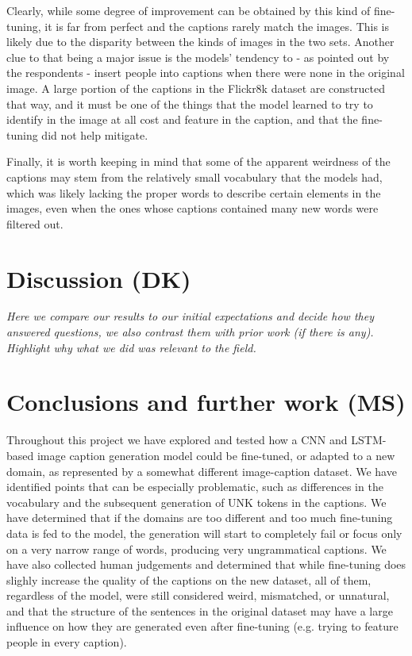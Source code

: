 \documentclass[11pt]{article}
\begin{document}
Clearly, while some degree of improvement can be obtained by this kind of fine-tuning, it is far from perfect and the captions rarely match the images. This is likely due to the disparity between the kinds of images in the two sets. Another clue to that being a major issue is the models' tendency to - as pointed out by the respondents - insert people into captions when there were none in the original image. A large portion of the captions in the Flickr8k dataset are constructed that way, and it must be one of the things that the model learned to try to identify in the image at all cost and feature in the caption, and that the fine-tuning did not help mitigate.

Finally, it is worth keeping in mind that some of the apparent weirdness of the captions may stem from the relatively small vocabulary that the models had, which was likely lacking the proper words to describe certain elements in the images, even when the ones whose captions contained many new words were filtered out. 

\section{Discussion (DK)}

\textit{Here we compare our results to our initial expectations and decide how they answered questions, we also contrast them with prior work (if there is any). Highlight why what we did was relevant to the field.}

\section{Conclusions and further work (MS)}

Throughout this project we have explored and tested how a CNN and LSTM-based image caption generation model could be fine-tuned, or adapted to a new domain, as represented by a somewhat different image-caption dataset. We have identified points that can be especially problematic, such as differences in the vocabulary and the subsequent generation of UNK tokens in the captions. We have determined that if the domains are too different and too much fine-tuning data is fed to the model, the generation will start to completely fail or focus only on a very narrow range of words, producing very ungrammatical captions. We have also collected human judgements and determined that while fine-tuning does slighly increase the quality of the captions on the new dataset, all of them, regardless of the model, were still considered weird, mismatched, or unnatural, and that the structure of the sentences in the original dataset may have a large influence on how they are generated even after fine-tuning (e.g. trying to feature people in every caption). 
\end{document}
